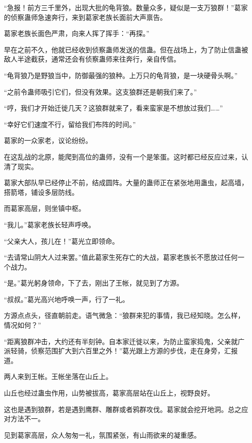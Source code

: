 
\begin{this_body}

“急报！前方三千里外，出现大批的龟背狼。数量众多，疑似是一支万狼群！”葛家的侦察蛊师急速奔行，来到葛家老族长面前大声禀告。

葛家老族长面色严肃，向来人挥了挥手：“再探。”

早在之前不久，他就已经收到侦察蛊师发送的信蛊。但在战场上，为了防止信蛊被敌人半途截获，通常还会有侦察蛊师来往奔行，亲自传信。

“龟背狼乃是野狼当中，防御最强的狼种。上万只的龟背狼，是一块硬骨头啊。”

“之前令蛊师吸引它们，但没有效果。这支狼群还是朝我们来了。”

“哼，我们才开始迁徙几天？这狼群就来了，看来蛮家是不想放过我们……”

“幸好它们速度不行，留给我们布阵的时间。”

葛家的一众家老，议论纷纷。

在这乱战的北原，能爬到高位的蛊师，没有一个是笨蛋。这时都已经反应过来，认清了现实。

葛家大部队早已经停止不前，结成圆阵。大量的蛊师正在紧张地用蛊虫，起高墙，搭箭塔，铺设多层防线。

而葛家高层，则坐镇中枢。

“我儿。”葛家老族长轻声呼唤。

“父亲大人，孩儿在！”葛光立即领命。

“去请常山阴大人过来罢。”值此葛家生死存亡的大战，葛家老族长不愿放过任何一个战力。

“是。”葛光躬身领命，下了去，刚出了王帐，就见到了方源。

“叔叔。”葛光高兴地呼唤一声，行了一礼。

方源点点头，径直朝前走。语气微急：“狼群来犯的事情，我已经知晓。怎么样，情况如何？”

“距离狼群冲击，大约还有半刻钟。自本家迁徙以来，为防止蛮家捣鬼，父亲就广派轻骑，侦察范围扩大到六百里之外！”葛光跟上方源的步伐，走在身旁，汇报道。

两人来到王帐。王帐坐落在山丘上。

山丘也经过蛊虫作用，山势被拔高，葛家高层站在山丘上，视野良好。

这也是遇到狼群，若是遇到鹰群、雕群或者鸦群攻伐。葛家就会挖开地洞。总之应对方法不一。

见到葛家高层，众人匆匆一礼，氛围紧张，有山雨欲来的凝重感。


\end{this_body}
